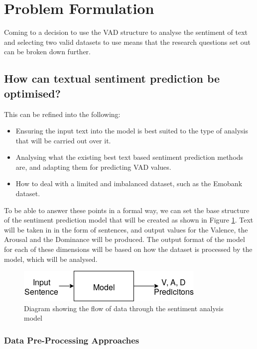 \section{Problem Formulation}

Coming to a decision to use the VAD structure to analyse the sentiment of text and selecting two valid datasets to use means that the research questions set out can be broken down further.

\subsection{How can textual sentiment prediction be optimised?}

This can be refined into the following: 

\begin{itemize}
    \item Ensuring the input text into the model is best suited to the type of analysis that will be carried out over it. 
    \item Analysing what the existing best text based sentiment prediction methods are, and adapting them for predicting VAD values. 
    \item How to deal with a limited and imbalanced dataset, such as the Emobank dataset.
\end{itemize}

To be able to answer these points in a formal way, we can set the base structure of the sentiment prediction model that will be created as shown in Figure \ref{intial:flow}. 
Text will be taken in in the form of sentences, and output values for the Valence, the Arousal and the Dominance will be produced. The output format of the model for each of these dimensions will be based on how the dataset is processed by the model, which will be analysed.

\begin{figure}[h]
\centering
\includegraphics[scale=0.5]{litImgs/initialFlow.png}
\caption{Diagram showing the flow of data through the sentiment analysis model}
\label{intial:flow}
\end{figure}

\subsubsection{Data Pre-Processing Approaches}

